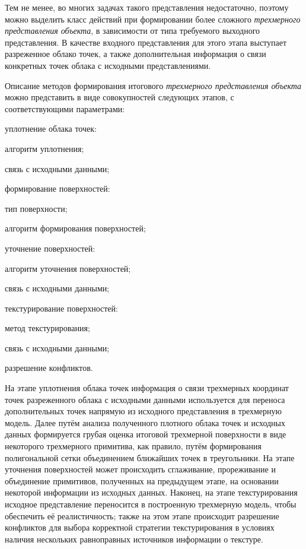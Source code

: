 Тем не менее, во многих задачах такого представления недостаточно, поэтому можно выделить класс действий при формировании более сложного \textit{трехмерного представления объекта}, в зависимости от типа требуемого выходного представления. В качестве входного представления для этого этапа выступает разреженное облако точек, а также дополнительная информация о связи конкретных точек облака с исходными представлениями.

Описание методов формирования итогового \textit{трехмерного представления объекта} можно представить в виде совокупностей следующих этапов, с соответствующими параметрами:
\begin{textitemize}
    \item уплотнение облака точек:
    \begin{textitemize}
        \item алгоритм уплотнения;
        \item связь с исходными данными;
    \end{textitemize}
    \item формирование поверхностей:
    \begin{textitemize}
        \item тип поверхности;
        \item алгоритм формирования поверхностей;
    \end{textitemize}
    \item уточнение поверхностей:
    \begin{textitemize}
        \item алгоритм уточнения поверхностей;
        \item связь с исходными данными;
    \end{textitemize}
    \item текстурирование поверхностей:
    \begin{textitemize}
        \item метод текстурирования;
        \item связь с исходными данными;
        \item разрешение конфликтов.
    \end{textitemize}
\end{textitemize}

На этапе уплотнения облака точек информация о связи трехмерных координат точек разреженного облака с исходными данными используется для переноса дополнительных точек напрямую из исходного представления в трехмерную модель. Далее путём анализа полученного плотного облака точек и исходных данных формируется грубая оценка итоговой трехмерной поверхности в виде некоторого трехмерного примитива, как правило, путём формирования полигональной сетки объединением ближайших точек в треугольники. На этапе уточнения поверхностей может происходить сглаживание, прореживание и объединение примитивов, полученных на предыдущем этапе, на основании некоторой информации из исходных данных. Наконец, на этапе текстурирования исходное представление переносится в построенную трехмерную модель, чтобы обеспечить её реалистичность; также на этом этапе происходит разрешение конфликтов для выбора корректной стратегии текстурирования в условиях наличия нескольких равноправных источников информации о текстуре.

